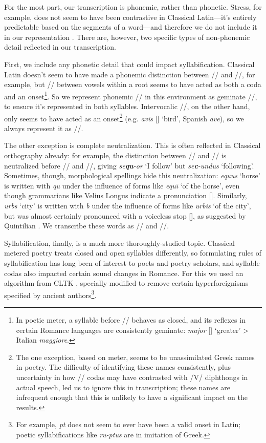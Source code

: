 \documentclass[12pt,twoside]{article}
\newcommand{\ipa}[1]{/\textipa{#1}/}
\newcommand{\ipab}[1]{[\textipa{#1}]}
\begin{document}
For the most part, our transcription is phonemic, rather than phonetic. Stress, for example, does not seem to have been contrastive in Classical Latin---it's entirely predictable based on the segments of a word---and therefore we do not include it in our representation \parencites[83]{allen}[I.5.30]{quintilian}. There are, however, two specific types of non-phonemic detail reflected in our transcription.

First, we include any phonetic detail that could impact syllabification. Classical Latin doesn't seem to have made a phonemic distinction between \ipa{j} and \ipa{jj}, for example, but \ipa{j} between vowels within a root seems to have acted as both a coda and an onset\footnote{In poetic meter, a syllable before \ipa{j} behaves as closed, and its reflexes in certain Romance languages are consistently geminate: \emph{major} \ipab{maj.jor} `greater' > Italian \emph{maggiore}.}. So we represent phonemic \ipa{j} in this environment as geminate \ipa{jj}, to ensure it's represented in both syllables. Intervocalic \ipa{w}, on the other hand, only seems to have acted as an onset\footnote{The one exception, based on meter, seems to be unassimilated Greek names in poetry. The difficulty of identifying these names consistently, plus uncertainty in how \ipa{w} codas may have contrasted with /V/ diphthongs in actual speech, led us to ignore this in transcription; these names are infrequent enough that this is unlikely to have a significant impact on the results.} (e.g. \emph{avis} \ipab{a.wis} `bird', Spanish \emph{ave}), so we always represent it as \ipa{w}.

The other exception is complete neutralization. This is often reflected in Classical orthography already: for example, the distinction between \ipa{k} and \ipa{k\super{w}} is neutralized before \ipa{u} and \ipa{u:}, giving \emph{se\textbf{qu}-or} `I follow' but \emph{se\textbf{c}-undus} `following'. Sometimes, though, morphological spellings hide this neutralization: \emph{equus} `horse' is written with \emph{qu} under the influence of forms like \emph{equ\=\i} `of the horse', even though grammarians like Velius Longus \citep[59.2-8]{longus} indicate a pronunciation \ipab{ekus}. Similarly, \emph{urbs} `city' is written with \emph{b} under the influence of forms like \emph{urbis} `of the city', but was almost certainly pronounced with a voiceless stop \ipab{urps}, as suggested by Quintilian \citep[I.7.7]{quintilian}. We transcribe these words as \ipa{ekus} and \ipa{urps}.

Syllabification, finally, is a much more thoroughly-studied topic. Classical metered poetry treats closed and open syllables differently, so formulating rules of syllabification has long been of interest to poets and poetry scholars, and syllable codas also impacted certain sound changes in Romance. For this we used an algorithm from CLTK \citep{cltk}, specially modified to remove certain hyperforeignisms specified by ancient authors\footnote{For example, \emph{pt} does not seem to ever have been a valid onset in Latin; poetic syllabifications like \emph{ru-ptus} are in imitation of Greek.}.
\end{document}
